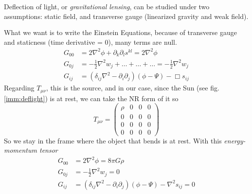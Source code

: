  \par
\bigskip
Deflection of light, or \emph{gravitational lensing}, can be studied under two assumptions: static field, and transverse gauge (linearized gravity and weak field).\par
What we want is to write the Einstein Equations, because of transverse gauge and staticness (time derivative = 0), many terms are null.
\begin{align}
	G_{00}& = 2\nabla ^{2}\phi  + \partial_{k}\partial_{l}s^{kl} = 2\nabla ^{2}\phi \\
	G_{0j}& = -\frac{1}{2}\nabla ^{2}w_{j}+ \ldots +\ldots +\ldots  = -\frac{1}{2}\nabla ^{2}w_{j} \\
G_{ij} & = \left( \delta _{ij}\nabla ^{2}-\partial_{i}\partial_{j} \right)\left( \phi -\Psi  \right)- \Box s_{ij} 
\end{align}
Regarding $T_{\mu \nu }$, this is the source, and in our case, since the Sun (see fig. \ref{imm:deflight}) is at rest, we can take the NR form of it so
\[
T_{\mu \nu } = \begin{pmatrix}
\rho  & 0 & 0 & 0 \\
0 & 0 & 0 & 0 \\
0 & 0 & 0 & 0 \\
0 & 0 & 0 & 0
\end{pmatrix} 
\]
So we stay in the frame where the object that bends is at rest. With this \emph{energy-momentum tensor} 
\begin{align}
	G_{00} &= 2\nabla ^{2}\phi = 8\pi G \rho \\
	G_{0j} &= -\frac{1}{2}\nabla ^{2}w_{j} = 0 \\
	G_{ij} &= \left( \delta _{ij}\nabla ^{2}- \partial_{i}\partial_{j} \right)\left( \phi -\Psi  \right)- \nabla ^{2}s_{ij} = 0
\end{align}
